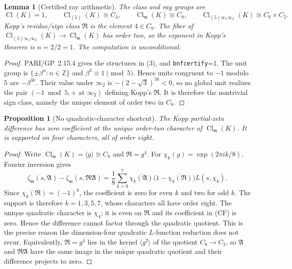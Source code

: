 \documentclass[11pt]{article}
\newtheorem{proposition}[theorem]{Proposition}
\newtheorem{lemma}[theorem]{Lemma}
\newcommand{\Cl}{\operatorname{Cl}}
\newcommand{\Z}{\mathbb Z}
\begin{document}
\begin{lemma}[Certified ray arithmetic]\label{lem:ray}
The class and ray groups are
\[
 \Cl(K)=1,\qquad
 \Cl_{(5)}(K)\cong C_4,\qquad
 \Cl_{\mathfrak m}(K)\cong C_8,\qquad
 \Cl_{(5)\infty_1\infty_2}(K)\cong C_8\times C_2.
\tag{3}
\]
Kopp's residue/sign class $\mathfrak R$ is the element $4\in C_8$.
The fiber of
$\Cl_{(5)\infty_1\infty_2}(K)\to\Cl_{\mathfrak m}(K)$ has order two,
so the exponent in Kopp's theorem is $n=2/2=1$.
The computation is unconditional.
\end{lemma}

\begin{proof}
PARI/GP~2.15.4 gives the structures in (3), and
\texttt{bnfcertify}=1.  The unit group is
$\{\pm\beta^n:n\in\Z\}$ and $\beta^3\equiv1\pmod5$.
Hence units congruent to $-1$ modulo $5$ are
$-\beta^{3k}$.  Their value under $\infty_2$ is
$-(2-\sqrt3)^{3k}<0$, so no global unit realizes the pair
$(-1\bmod5,+\text{ at }\infty_2)$ defining Kopp's $\mathfrak R$.
It is therefore the nontrivial sign class, namely the unique element
of order two in $C_8$.
\end{proof}

\begin{proposition}[No quadratic-character shortcut]\label{prop:noquadratic}
The Kopp partial-zeta difference has zero coefficient at the unique
order-two character of $\Cl_{\mathfrak m}(K)$.  It is supported on four
characters, all of order eight.
\end{proposition}

\begin{proof}
Write $\Cl_{\mathfrak m}(K)=\langle g\rangle\cong C_8$ and
$\mathfrak R=g^4$.  For
$\chi_k(g)=\exp(2\pi i k/8)$, Fourier inversion gives
\[
\zeta_{\mathfrak m}(s,\mathfrak A)
-\zeta_{\mathfrak m}(s,\mathfrak R\mathfrak A)
=\frac18\sum_{k=0}^7
\overline{\chi_k(\mathfrak A)}
\bigl(1-\overline{\chi_k(\mathfrak R)}\bigr)L(s,\chi_k).
\tag{CF}
\]
Since $\chi_k(\mathfrak R)=(-1)^k$, the coefficient is zero for even
$k$ and two for odd $k$.  The support is therefore
$k=1,3,5,7$, whose characters all have order eight.  The unique
quadratic character is $\chi_4$; it is even on $\mathfrak R$ and its
coefficient in \textup{(CF)} is zero.  Hence the difference cannot
factor through the quadratic quotient.  This is the precise reason
the dimension-four quadratic $L$-function reduction does not recur.
Equivalently, $\mathfrak R=g^4$ lies in the kernel
$\langle g^2\rangle$ of the quotient $C_8\to C_2$, so
$\mathfrak A$ and $\mathfrak R\mathfrak A$ have the same image in the
unique quadratic quotient and their difference projects to zero.
\end{proof}
\end{document}
